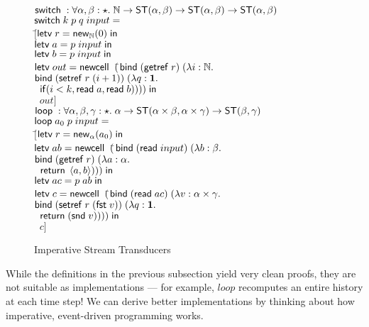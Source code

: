 \begin{figure}
\begin{tabbing}
$\mathsf{switch}\; : \forall \alpha,\beta:\star.\; \mathbb{N} \to \mathsf{ST}({\alpha}, {\beta}) \to \mathsf{ST}({\alpha}, {\beta}) \to \mathsf{ST}({\alpha}, {\beta})$ \\
$\mathsf{switch}\; k\;p\;q\; input =  $ \\
\;\;$[$\=$\mathsf{letv}\;r = \mathsf{new}_{\mathbb{N}}(0)\;\mathsf{in}\;$ \\
    \>$\letv{a}{p\;input}$ \\
    \>$\letv{b}{p\;input}$ \\
    \>$\mathsf{letv}\; out = \mathsf{newcell}\;\; ($\=$\mathsf{bind}\; (\mathsf{getref}\; r) \;(\lambda i:\mathbb{N}.\;$ \\
    \>                                 \>$\mathsf{bind}\; (\mathsf{setref}\; r\;(i+1)) \; (\lambda q:\mathbf{1}.$ \\
    \>                                 \>$\;\;\mathsf{if}(i < k, \mathsf{read}\; a, \mathsf{read}\; b)))) \;\mathsf{in}$ \\
    \>$\;\;out]$\\[1em]

$\mathsf{loop}\; : \forall \alpha,\beta,\gamma:\star.\; \alpha \to \mathsf{ST}({\alpha\times \beta}, {\alpha\times \gamma}) \to \mathsf{ST}({\beta}, {\gamma})$ \\
$\mathsf{loop}\; a_0\; p \; input = $ \\
\;\;$[$\=$\mathsf{letv}\;r = \mathsf{new}_{\alpha}(a_0)\;\mathsf{in}\;$ \\
    \>$\mathsf{letv}\; ab = \mathsf{newcell}\;\; ($\=$\mathsf{bind}\; (\mathsf{read}\; input)\; (\lambda b:\beta.$ \\
    \>                                \>$\mathsf{bind}\; (\mathsf{getref}\; r)\;       (\lambda a:\alpha.$ \\
    \>                                \>$\;\; \mathsf{return}\; \left<{a},{b}\right>))) \;\mathsf{in}$ \\
    \>$\mathsf{letv}\;ac = p\;ab\;\mathsf{in}\;$ \\
    \>$\mathsf{letv}\;c = \mathsf{newcell}\;\; ($\=$\mathsf{bind}\; (\mathsf{read}\; ac) \;(\lambda v:\alpha \times \gamma.$ \\
    \>                              \>$\mathsf{bind}\; (\mathsf{setref}\; r\;(\mathsf{fst}\; v)) \;(\lambda q:\mathbf{1}.$ \\
    \>                              \>$\;\;\mathsf{return}\; (\mathsf{snd}\; v))))\;\mathsf{in}$ \\
    \>$\;\;c]$ 
\end{tabbing}
\caption{Imperative Stream Transducers}
\label{imperative-transducer-impl}
\end{figure}

While the definitions in the previous subsection yield very clean
proofs, they are not suitable as implementations --- for example,
$loop$ recomputes an entire history at each time step! We can derive
better implementations by thinking about how imperative, event-driven
programming works.

